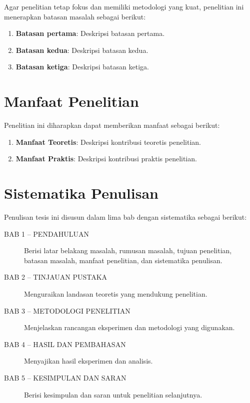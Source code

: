 Agar penelitian tetap fokus dan memiliki metodologi yang kuat, penelitian ini menerapkan batasan masalah sebagai berikut:

\begin{enumerate}
    \item \textbf{Batasan pertama}: Deskripsi batasan pertama.
    \item \textbf{Batasan kedua}: Deskripsi batasan kedua.
    \item \textbf{Batasan ketiga}: Deskripsi batasan ketiga.
\end{enumerate}

\section{Manfaat Penelitian}
\label{sec:manfaat_penelitian}

Penelitian ini diharapkan dapat memberikan manfaat sebagai berikut:

\begin{enumerate}
    \item \textbf{Manfaat Teoretis}: Deskripsi kontribusi teoretis penelitian.
    \item \textbf{Manfaat Praktis}: Deskripsi kontribusi praktis penelitian.
\end{enumerate}

\section{Sistematika Penulisan}
\label{sec:sistematika_penulisan}

Penulisan tesis ini disusun dalam lima bab dengan sistematika sebagai berikut:

\begin{description}
    \item[BAB 1 -- PENDAHULUAN] Berisi latar belakang masalah, rumusan masalah, tujuan penelitian, batasan masalah, manfaat penelitian, dan sistematika penulisan.
    \item[BAB 2 -- TINJAUAN PUSTAKA] Menguraikan landasan teoretis yang mendukung penelitian.
    \item[BAB 3 -- METODOLOGI PENELITIAN] Menjelaskan rancangan eksperimen dan metodologi yang digunakan.
    \item[BAB 4 -- HASIL DAN PEMBAHASAN] Menyajikan hasil eksperimen dan analisis.
    \item[BAB 5 -- KESIMPULAN DAN SARAN] Berisi kesimpulan dan saran untuk penelitian selanjutnya.
\end{description}